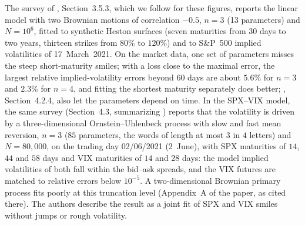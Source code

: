The survey of \textcite{cuchiero-gazzani-moller-svaluto-ferro-2026}, Section~3.5.3, which we follow for these figures,
reports the linear model with
two Brownian motions of correlation $-0.5$, $n=3$ (13 parameters) and $N=10^6$, fitted to synthetic Heston surfaces
(seven maturities from $30$ days to two years, thirteen strikes from $80\%$ to $120\%$) and to S\&P~500 implied
volatilities of 17~March~2021. On the market data, one set of parameters misses the steep short-maturity smiles;
with a loss close to the maximal error, the largest relative implied-volatility errors beyond $60$ days are about
$5.6\%$ for $n=3$ and $2.3\%$ for $n=4$, and fitting the shortest maturity separately does better;
\textcite{cuchiero-gazzani-svaluto-ferro-2023}, Section~4.2.4, also let the parameters depend on time. In the SPX--VIX
model, the same survey (Section~4.3, summarizing \textcite{cuchiero-gazzani-moller-svaluto-ferro-2025}) reports that the
volatility is
driven by a three-dimensional Ornstein--Uhlenbeck process with slow and fast mean reversion, $n=3$ ($85$
parameters, the words of length at most $3$ in $4$ letters) and $N=80{,}000$, on the trading day 02/06/2021 (2~June),
with SPX maturities of
$14$, $44$ and $58$ days and VIX maturities of $14$ and $28$ days: the model implied volatilities of both fall within
the bid--ask spreads, and the VIX futures are matched to relative errors below $10^{-5}$. A two-dimensional Brownian
primary process fits poorly at this truncation level (Appendix~A of the paper, as cited there). The authors describe the result as a joint fit of SPX and VIX
smiles without jumps or rough volatility.

